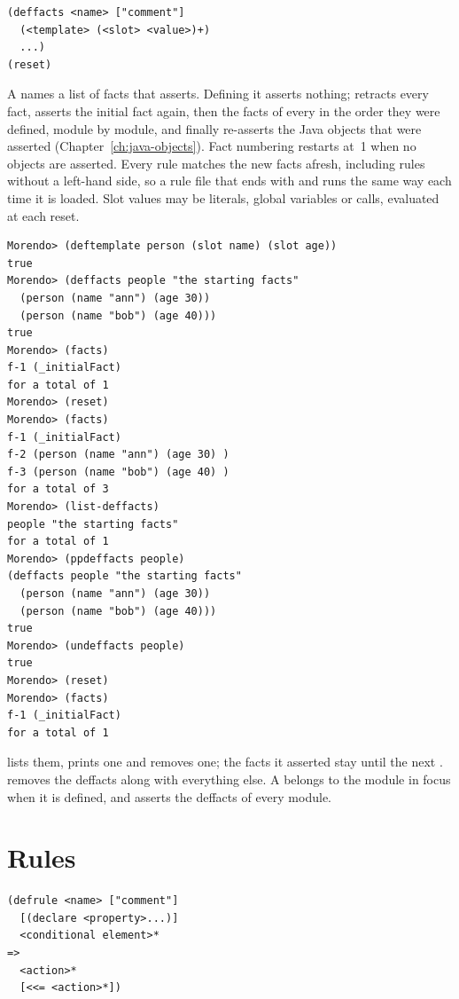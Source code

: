 \begin{lstlisting}
(deffacts <name> ["comment"]
  (<template> (<slot> <value>)+)
  ...)
(reset)
\end{lstlisting}

A  names a list of facts that  asserts. Defining
it asserts nothing;  retracts every fact, asserts the initial
fact again, then the facts of every  in the order they were
defined, module by module, and finally re-asserts the Java objects that
were asserted (Chapter~\ref{ch:java-objects}). Fact numbering restarts
at~1 when no objects are asserted. Every rule matches the new facts
afresh, including rules without a left-hand side, so a rule file that
ends with  and  runs the same way each time it is
loaded. Slot values may be literals, global variables or calls, evaluated
at each reset.

\begin{lstlisting}[style=shell]
Morendo> (deftemplate person (slot name) (slot age))
true
Morendo> (deffacts people "the starting facts"
  (person (name "ann") (age 30))
  (person (name "bob") (age 40)))
true
Morendo> (facts)
f-1 (_initialFact)
for a total of 1
Morendo> (reset)
Morendo> (facts)
f-1 (_initialFact)
f-2 (person (name "ann") (age 30) )
f-3 (person (name "bob") (age 40) )
for a total of 3
Morendo> (list-deffacts)
people "the starting facts"
for a total of 1
Morendo> (ppdeffacts people)
(deffacts people "the starting facts"
  (person (name "ann") (age 30))
  (person (name "bob") (age 40)))
true
Morendo> (undeffacts people)
true
Morendo> (reset)
Morendo> (facts)
f-1 (_initialFact)
for a total of 1
\end{lstlisting}

 lists them,  prints one and
 removes one; the facts it asserted stay until the
next .  removes the deffacts along with everything
else. A  belongs to the module in focus when it is defined,
and  asserts the deffacts of every module.

\section{Rules}
\label{sec:rules}

\begin{lstlisting}
(defrule <name> ["comment"]
  [(declare <property>...)]
  <conditional element>*
=>
  <action>*
  [<<= <action>*])
\end{lstlisting}

